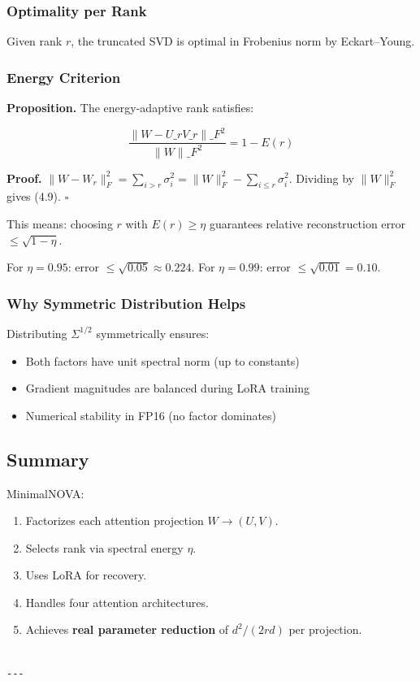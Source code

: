 \subsubsection{Optimality per Rank}

Given rank $r$, the truncated SVD is optimal in Frobenius norm by Eckart--Young.

\subsubsection{Energy Criterion}

\textbf{Proposition.} The energy-adaptive rank satisfies:

\[
\frac{\|W - U\_r V\_r\|\_F^2}{\|W\|\_F^2} = 1 - E(r)
\tag{4.9}
\]

\textbf{Proof.} $\|W - W_r\|_F^2 = \sum_{i > r} \sigma_i^2 = \|W\|_F^2 - \sum_{i \leq r} \sigma_i^2$. 
Dividing by $\|W\|_F^2$ gives (4.9). $\square$

This means: choosing $r$ with $E(r) \geq \eta$ guarantees relative 
reconstruction error $\leq \sqrt{1 - \eta}$.

For $\eta = 0.95$: error $\leq \sqrt{0.05} \approx 0.224$.
For $\eta = 0.99$: error $\leq \sqrt{0.01} = 0.10$.

\subsubsection{Why Symmetric Distribution Helps}

Distributing $\Sigma^{1/2}$ symmetrically ensures:
\begin{itemize}
\item Both factors have unit spectral norm (up to constants)
\item Gradient magnitudes are balanced during LoRA training
\item Numerical stability in FP16 (no factor dominates)

\end{itemize}
\subsection{Summary}

MinimalNOVA:
\begin{enumerate}
\item Factorizes each attention projection $W \to (U, V)$.
\item Selects rank via spectral energy $\eta$.
\item Uses LoRA for recovery.
\item Handles four attention architectures.
\item Achieves \textbf{real parameter reduction} of $d^2 / (2rd)$ per projection.
\end{enumerate}
\begin{lstlisting}

---
\end{lstlisting}

